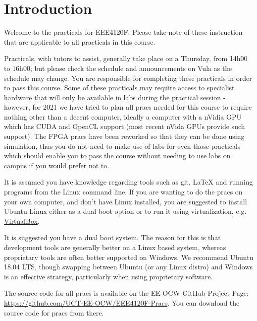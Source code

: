 \section*{Introduction}
Welcome to the practicals for EEE4120F. Please take note of these instruction that are applicable to all practicals in this course.

Practicals, with tutors to assist, generally take place on a Thursday, from 14h00 to 16h00; but please check the schedule and announcements on Vula as the schedule may change. You are responsible for completing these practicals in order to pass this course. Some of these practicals may require access to specialist hardware that will only be available in labs during the practical session - however, for 2021 we have tried to plan all pracs needed for this course to require nothing other than a decent computer, ideally a computer with a nVidia GPU which has CUDA and OpenCL support (most recent nVida GPUs provide such support). The FPGA pracs have been reworked so that they can be done using simulation, thus you do not need to make use of labs for even those practicals which should enable you to pass the course without needing to use labs on campus if you would prefer not to.

It is assumed you have knowledge regarding tools such as git, \LaTeX{} and running programs from the Linux command line. If you are wanting to do the pracs on your own computer, and don't have Linux installed, you are suggested to install Ubuntu Linux either as a dual boot option or to run it using virtualization, e.g. \href{https://www.virtualbox.org/}{VirtualBox}.

It is suggested you have a dual boot system. The reason for this is that development tools are generally better on a Linux based system, whereas proprietary tools are often better supported on Windows. We recommend Ubuntu 18.04 LTS, though swapping between Ubuntu (or any Linux distro) and Windows is an effective strategy, particularly when using proprietary software.

The source code for all pracs is available on the EE-OCW GitHub Project Page: \href{https://github.com/UCT-EE-OCW/EEE4120F-Pracs}{https://github.com/UCT-EE-OCW/EEE4120F-Pracs}. You can download the source code for pracs from there.